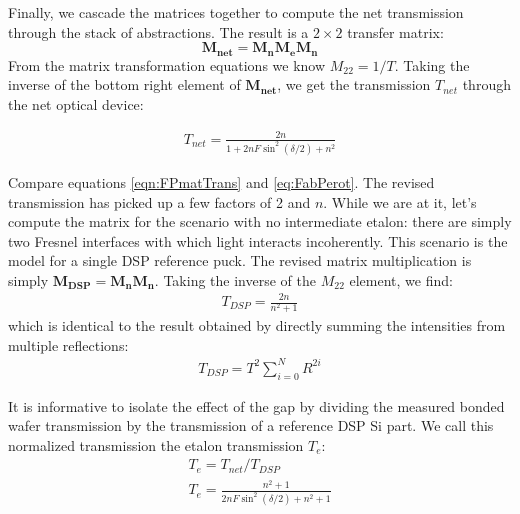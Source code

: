 \documentclass[osajnl,preprint,showpacs,superscriptaddress,12pt]{revtex4-1} %
\begin{document}
Finally, we cascade the matrices together to compute the net transmission through the stack of abstractions.  The result is a $2\times2$ transfer matrix: $$\boldsymbol{M_{net}}=\boldsymbol{M_n}\boldsymbol{M_e}\boldsymbol{M_n}$$  From the matrix transformation equations \cite{2007fuph.book.....S} we know $M_{22}=1/T$.  Taking the inverse of the bottom right element of $\boldsymbol{M_{net}}$, we get the transmission $T_{net}$ through the net optical device: 

\begin{eqnarray}
T_{net}=\frac{2 n}{1+ 2n F\sin ^2(\delta/2)+n^2} \label{eqn:FPmatTrans}
\end{eqnarray}

Compare equations \ref{eqn:FPmatTrans} and \ref{eq:FabPerot}.  The revised transmission has picked up a few factors of 2 and $n$.  While we are at it, let's compute the matrix for the scenario with no intermediate etalon: there are simply two Fresnel interfaces with which light interacts incoherently.  This scenario is the model for a single DSP reference puck. The revised matrix multiplication is simply $\boldsymbol{M_{DSP}}=\boldsymbol{M_n}\boldsymbol{M_n}$.  Taking the inverse of the $M_{22}$ element, we find: 
\begin{eqnarray}
T_{DSP}=\frac{2 n}{n^2+1}\label{eqn:EqofSummedSlab}
\end{eqnarray}
which is identical to the result obtained by directly summing the intensities from multiple reflections:
\begin{eqnarray}
T_{DSP}=T^2 \sum_{i=0}^{N}R^{2i} \label{eqn:multsum}
\end{eqnarray}

It is informative to isolate the effect of the gap by dividing the measured bonded wafer transmission by the transmission of a reference DSP Si part.  We call this normalized transmission the etalon transmission $T_{e}$:
\begin{eqnarray}
T_{e} = T_{net}/T_{DSP} \\
T_{e} = \frac{n^2+1}{2 n F \sin ^2(\delta/2)+n^2+1} \label{eqn:Tetalon}
\end{eqnarray}







\end{document}
